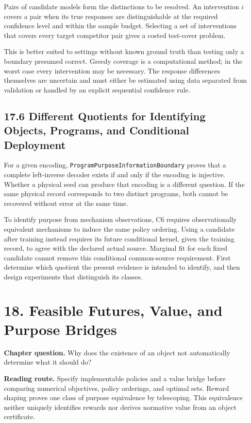 \documentclass[
  english,
  11pt,
  oneside]{book}
\begin{document}
Pairs of candidate models form the distinctions to be resolved. An intervention \(i\) covers a pair when its true responses are distinguishable at the required confidence level and within the sample budget. Selecting a set of interventions that covers every target competitor pair gives a costed test-cover problem.

This is better suited to settings without known ground truth than testing only a boundary presumed correct. Greedy coverage is a computational method; in the worst case every intervention may be necessary. The response differences themselves are uncertain and must either be estimated using data separated from validation or handled by an explicit sequential confidence rule.

\section{17.6 Different Quotients for Identifying Objects, Programs, and Conditional Deployment}\label{different-quotients-for-identifying-objects-programs-and-conditional-deployment}

For a given encoding, \nolinkurl{ProgramPurposeInformationBoundary} proves that a complete left-inverse decoder exists if and only if the encoding is injective. Whether a physical seed can produce that encoding is a different question. If the same physical record corresponds to two distinct programs, both cannot be recovered without error at the same time.

To identify purpose from mechanism observations, C6 requires observationally equivalent mechanisms to induce the same policy ordering. Using a candidate after training instead requires its future conditional kernel, given the training record, to agree with the declared actual source. Marginal fit for each fixed candidate cannot remove this conditional common-source requirement. First determine which quotient the present evidence is intended to identify, and then design experiments that distinguish its classes.

\chapter{18. Feasible Futures, Value, and Purpose Bridges}\label{ch-18}

\textbf{Chapter question.} Why does the existence of an object not automatically determine what it should do?

\textbf{Reading route.} Specify implementable policies and a value bridge before comparing numerical objectives, policy orderings, and optimal sets. Reward shaping proves one class of purpose equivalence by telescoping. This equivalence neither uniquely identifies rewards nor derives normative value from an object certificate.
\end{document}
